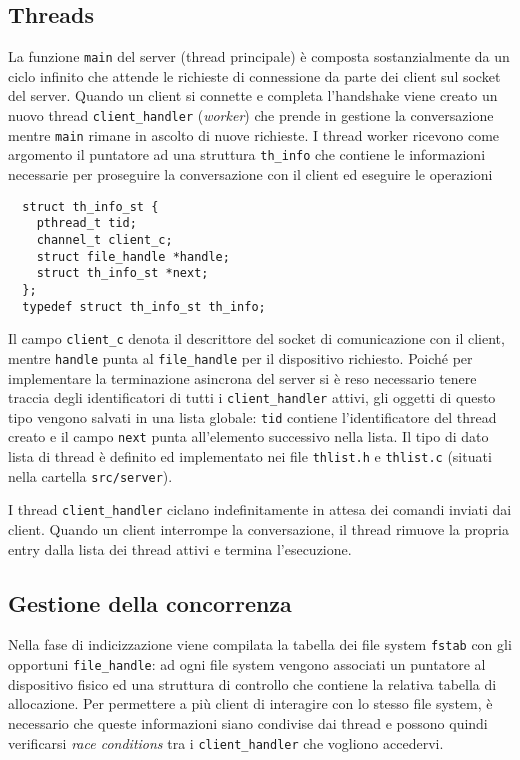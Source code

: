 \documentclass[11pt,oneside,a4paper]{article}
\begin{document}
\subsection{Threads}
La funzione \texttt{main} del server (thread principale) è composta sostanzialmente da un ciclo infinito che attende le richieste di connessione da parte dei client sul socket del server. Quando un client si connette e completa l'handshake viene creato un nuovo thread \texttt{client\_handler} (\emph{worker}) che prende in gestione la conversazione mentre \texttt{main} rimane in ascolto di nuove richieste. I thread worker ricevono come argomento il puntatore ad una struttura \texttt{th\_info} che contiene le informazioni necessarie per proseguire la conversazione con il client ed eseguire le operazioni
\begin{verbatim}
  struct th_info_st {
    pthread_t tid;
    channel_t client_c;
    struct file_handle *handle;
    struct th_info_st *next;
  };
  typedef struct th_info_st th_info;
\end{verbatim}
Il campo \texttt{client\_c} denota il descrittore del socket di comunicazione con il client, mentre \texttt{handle} punta al \texttt{file\_handle} per il dispositivo richiesto. Poiché per implementare la terminazione asincrona del server si è reso necessario tenere traccia degli identificatori di tutti i \texttt{client\_handler} attivi, gli oggetti di questo tipo vengono salvati in una lista globale: \texttt{tid} contiene l'identificatore del thread creato e il campo \texttt{next} punta all'elemento successivo nella lista. Il tipo di dato lista di thread è definito ed implementato nei file \texttt{thlist.h} e \texttt{thlist.c} (situati nella cartella \texttt{src/server}).

I thread \texttt{client\_handler} ciclano indefinitamente in attesa dei comandi inviati dai client. Quando un client interrompe la conversazione, il thread rimuove la propria entry dalla lista dei thread attivi e termina l'esecuzione.

\subsection{Gestione della concorrenza}
Nella fase di indicizzazione viene compilata la tabella dei file system \texttt{fstab} con gli opportuni \texttt{file\_handle}: ad ogni file system vengono associati un puntatore al dispositivo fisico ed una struttura di controllo che contiene la relativa tabella di allocazione. Per permettere a più client di interagire con lo stesso file system, è necessario che queste informazioni siano condivise dai thread e possono quindi verificarsi \emph{race conditions} tra i \texttt{client\_handler} che vogliono accedervi.
\end{document}
